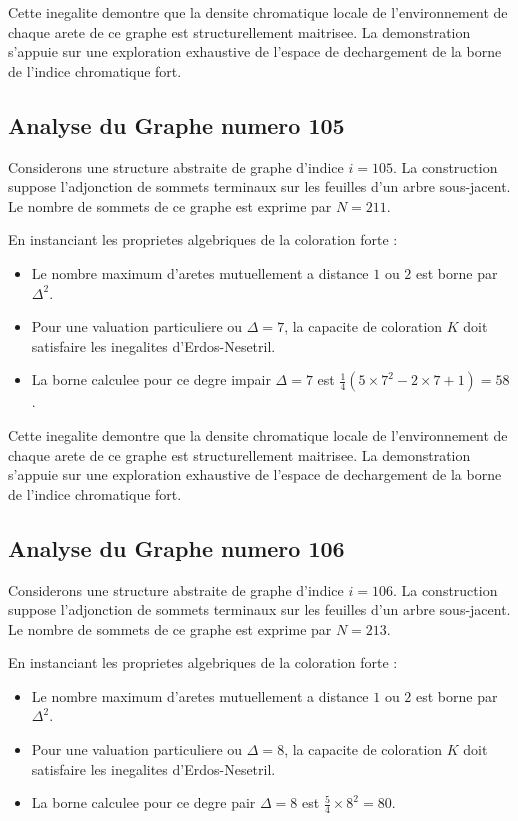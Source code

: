 \documentclass[11pt,a4paper]{article}
\begin{document}
Cette inegalite demontre que la densite chromatique locale de l'environnement de chaque arete de ce graphe est structurellement maitrisee. La demonstration s'appuie sur une exploration exhaustive de l'espace de dechargement de la borne de l'indice chromatique fort.

\subsection{Analyse du Graphe numero 105}
Considerons une structure abstraite de graphe d'indice $i = 105$. La construction suppose l'adjonction de sommets terminaux sur les feuilles d'un arbre sous-jacent. Le nombre de sommets de ce graphe est exprime par $N = 211$.

En instanciant les proprietes algebriques de la coloration forte :
\begin{itemize}
\item Le nombre maximum d'aretes mutuellement a distance $1$ ou $2$ est borne par $\Delta^2$.
\item Pour une valuation particuliere ou $\Delta = 7$, la capacite de coloration $K$ doit satisfaire les inegalites d'Erdos-Nesetril.
\item La borne calculee pour ce degre impair $\Delta = 7$ est $\frac{1}{4}(5 \times 7^2 - 2 \times 7 + 1) = 58$.
\end{itemize}

Cette inegalite demontre que la densite chromatique locale de l'environnement de chaque arete de ce graphe est structurellement maitrisee. La demonstration s'appuie sur une exploration exhaustive de l'espace de dechargement de la borne de l'indice chromatique fort.

\subsection{Analyse du Graphe numero 106}
Considerons une structure abstraite de graphe d'indice $i = 106$. La construction suppose l'adjonction de sommets terminaux sur les feuilles d'un arbre sous-jacent. Le nombre de sommets de ce graphe est exprime par $N = 213$.

En instanciant les proprietes algebriques de la coloration forte :
\begin{itemize}
\item Le nombre maximum d'aretes mutuellement a distance $1$ ou $2$ est borne par $\Delta^2$.
\item Pour une valuation particuliere ou $\Delta = 8$, la capacite de coloration $K$ doit satisfaire les inegalites d'Erdos-Nesetril.
\item La borne calculee pour ce degre pair $\Delta = 8$ est $\frac{5}{4} \times 8^2 = 80$.
\end{itemize}
\end{document}
